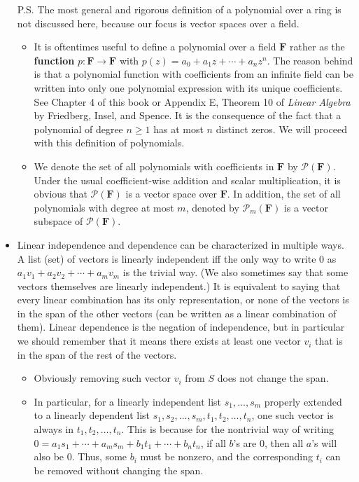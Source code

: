 \documentclass[11pt]{article}
\newcommand{\F}{\mathbf{F}}
\begin{document}
\begin{itemize}
    P.S. The most general and rigorous definition of a polynomial over a ring is not discussed here, because our focus is vector spaces over a field.
    \begin{itemize}
        \item It is oftentimes useful to define a polynomial over a field $\F$ rather as the \textbf{function} $p: \F \rightarrow \F$ with $p(z) = a_0 + a_1 z + \cdots + a_n z^n$. The reason behind is that a polynomial function with coefficients from an infinite field can be written into only one polynomial expression with its unique coefficients. See Chapter 4 of this book or Appendix E, Theorem 10 of \textit{Linear Algebra} by Friedberg, Insel, and Spence. It is the consequence of the fact that a polynomial of degree $n \geq 1$ has at most $n$ distinct zeros. We will proceed with this definition of polynomials.
        \item We denote the set of all polynomials with coefficients in $\F$ by $\mathcal{P}(\F)$. Under the usual coefficient-wise addition and scalar multiplication, it is obvious that $\mathcal{P}(\F)$ is a vector space over $\F$. In addition, the set of all polynomials with degree at most $m$, denoted by $\mathcal{P}_m(\F)$ is a vector subspace of $\mathcal{P}(\F)$.
    \end{itemize}
    \item Linear independence and dependence can be characterized in multiple ways. A list (set) of vectors is linearly independent iff the only way to write 0 as $a_1v_1 + a_2v_2 + \cdots +a_mv_m$ is the trivial way. (We also sometimes say that some vectors themselves are linearly independent.) It is equivalent to saying that every linear combination has its only representation, or none of the vectors is in the span of the other vectors (can be written as a linear combination of them). Linear dependence is the negation of independence, but in particular we should remember that it means there exists at least one vector $v_i$ that is in the span of the rest of the vectors.
    \begin{itemize}
        \item Obviously removing such vector $v_i$ from $S$ does not change the span.
        \item In particular, for a linearly independent list $s_1, \dots, s_m$ properly extended to a linearly dependent list $s_1, s_2,\dots, s_m, t_1,t_2, \dots, t_n$, one such vector is always in $t_1,t_2,\dots,t_n$. This is because for the nontrivial way of writing $0 = a_1s_1 + \cdots +a_ms_m + b_1 t_1 + \cdots + b_n t_n$, if all $b$'s are 0, then all $a$'s will also be 0. Thus, some $b_i$ must be nonzero, and the corresponding $t_i$ can be removed without changing the span.

\end{itemize}
\end{itemize}
\end{document}
